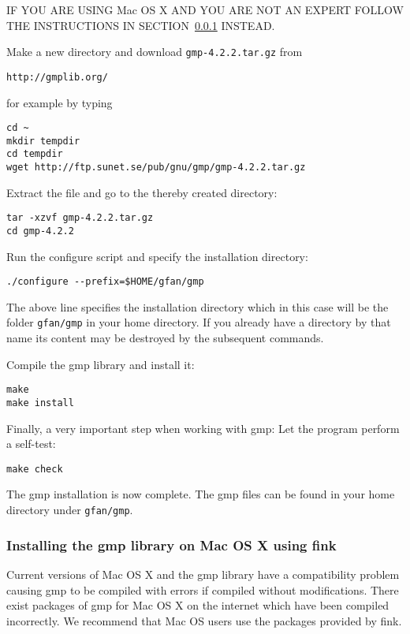 \vspace{0.3cm}
IF YOU ARE USING Mac OS X AND YOU ARE NOT AN EXPERT FOLLOW THE INSTRUCTIONS IN SECTION~\ref{sec:fink} INSTEAD.

\vspace{0.3cm}
\noindent
Make a new directory and download {\tt gmp-4.2.2.tar.gz} from

\centerline{\tt http://gmplib.org/}

\noindent
for example by typing
\begin{verbatim}
cd ~
mkdir tempdir
cd tempdir
wget http://ftp.sunet.se/pub/gnu/gmp/gmp-4.2.2.tar.gz
\end{verbatim}
Extract the file and go to the thereby created directory:
\begin{verbatim}
tar -xzvf gmp-4.2.2.tar.gz
cd gmp-4.2.2
\end{verbatim}
Run the configure script and specify the installation directory:
\begin{verbatim}
./configure --prefix=$HOME/gfan/gmp
\end{verbatim}
The above line specifies the installation directory which in this case
will be the folder {\tt gfan/gmp} in your home directory. If you already have
a directory by that name its content may be destroyed by the subsequent commands.

Compile the gmp library and install it:
\begin{verbatim}
make
make install
\end{verbatim}
Finally, a very important step when working with gmp: Let the program
perform a self-test:
\begin{verbatim}
make check
\end{verbatim}
The gmp installation is now complete. The gmp files can be found in your
home directory under {\tt gfan/gmp}.

\subsubsection{Installing the gmp library on Mac OS X using fink}
\label{sec:fink}
Current versions of Mac OS X and the gmp library have a compatibility
problem causing gmp to be compiled with errors if compiled without
modifications. There exist packages of gmp for Mac OS X on the internet
which have been compiled incorrectly. We recommend that Mac OS users
use the packages provided by fink.

\vspace{0.3cm}

